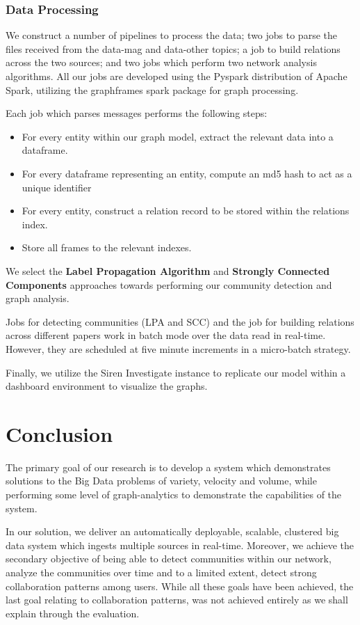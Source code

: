 \documentclass[10pt,journal,final,a4paper]{IEEEtran}
\begin{document}
\subsubsection{Data Processing}
We construct a number of pipelines to process the data; two jobs to parse the files received from the data-mag and data-other topics; a job to build relations across the two sources; and two jobs which perform two network analysis algorithms. All our jobs are developed using the Pyspark distribution of Apache Spark, utilizing the graphframes spark package for graph processing.

Each job which parses messages performs the following steps:
\begin{itemize}
\item For every entity within our graph model, extract the relevant data into a dataframe.
\item For every dataframe representing an entity, compute an md5 hash to act as a unique identifier
\item For every entity, construct a relation record to be stored within the relations index.
\item Store all frames to the relevant indexes.
\end{itemize}

We select the \textbf{Label Propagation Algorithm} and \textbf{Strongly Connected Components} approaches towards performing our community detection and graph analysis.

Jobs for detecting communities (LPA and SCC) and the job for building relations across different papers work in batch mode over the data read in real-time. However, they are scheduled at five minute increments in a micro-batch strategy.

Finally, we utilize the Siren Investigate instance to replicate our model within a dashboard environment to visualize the graphs.

\section{Conclusion}
The primary goal of our research is to develop a system which demonstrates solutions to the Big Data problems of variety, velocity and volume, while performing some level of graph-analytics to demonstrate the capabilities of the system. 

In our solution, we deliver an automatically deployable, scalable, clustered big data system which ingests multiple sources in real-time. Moreover, we achieve the secondary objective of being able to detect communities within our network, analyze the communities over time and to a limited extent, detect strong collaboration patterns among users. While all these goals have been achieved, the last goal relating to collaboration patterns, was not achieved entirely as we shall explain through the evaluation.
\end{document}
